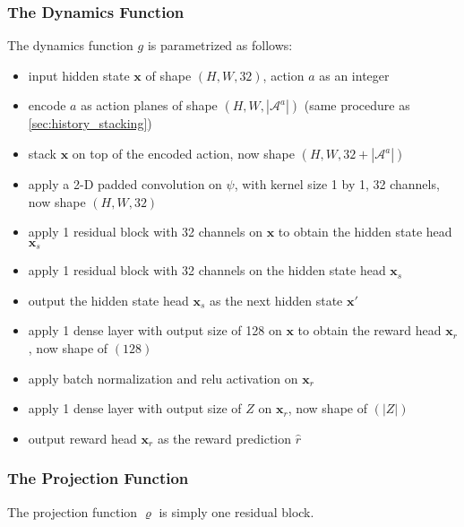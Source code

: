\subsubsection{The Dynamics Function}
The dynamics function $g$ is parametrized as follows:
\begin{itemize}
    \item input hidden state $\mathbf{x}$ of shape $(H, W, 32)$, action $a$ as an integer
    \item encode $a$ as action planes of shape $(H, W, |\mathcal{A}^a|)$ (same procedure as \ref{sec:history_stacking})
    \item stack $\mathbf{x}$ on top of the encoded action, now shape $(H, W, 32 + |\mathcal{A}^a|)$

    \item apply a 2-D padded convolution on $\psi$, with kernel size 1 by 1, 32 channels, now shape $(H, W, 32)$
    \item apply 1 residual block with 32 channels on $\mathbf{x}$ to obtain the hidden state head $\mathbf{x}_s$
    \item apply 1 residual block with 32 channels on the hidden state head $\mathbf{x}_s$
    \item output the hidden state head $\mathbf{x}_s$ as the next hidden state $\mathbf{x}'$

    \item apply 1 dense layer with output size of 128 on $\mathbf{x}$ to obtain the reward head $\mathbf{x}_r$, now shape of $(128)$
    \item apply batch normalization and relu activation on $\mathbf{x}_r$
    \item apply 1 dense layer with output size of $Z$ on $\mathbf{x}_r$, now shape of $(|Z|)$
    \item output reward head $\mathbf{x}_r$ as the reward prediction $\hat{r}$
\end{itemize}

\subsubsection{The Projection Function}
The projection function $\varrho$ is simply one residual block.

